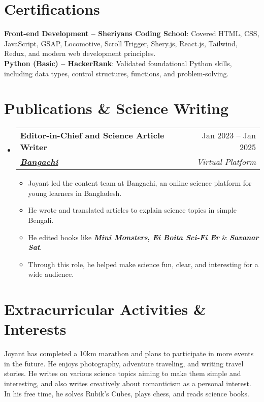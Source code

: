 \documentclass[a4paper, 11pt]{article}
\newcommand{\resumeItem}[1]{
  \item\small{
    {#1 \vspace{-2pt}}
  }
}
\newcommand{\resumeSubheading}[5]{
  \vspace{-2pt}\item
    \begin{tabularx}{\textwidth}[t]{X r}
      \textbf{#1} & #2 \\
      \textbf{\textit{\href{#3}{\small #4}}} & \textit{\small #5} \\
    \end{tabularx}\vspace{-7pt}
}
\newcommand{\resumeSubHeadingListStart}{\begin{itemize}[leftmargin=0in, label={}]}
\newcommand{\resumeSubHeadingListEnd}{\end{itemize}}
\newcommand{\resumeItemListStart}{\begin{itemize}}
\newcommand{\resumeItemListEnd}{\end{itemize}\vspace{-5pt}}
\begin{document}
\section{\textbf{Certifications}}
  \begin{itemize}[leftmargin=0in, label={}]
    \small{\item{
      \textbf{Front-end Development – Sheriyans Coding School}{: Covered HTML, CSS, JavaScript, GSAP, Locomotive, Scroll Trigger, Shery.js, React.js, Tailwind, Redux, and modern web development principles.} \\
      \textbf{Python (Basic) – HackerRank}{: Validated foundational Python skills, including data types, control structures, functions, and problem-solving.}
    }}
  \end{itemize}

\section{\textbf{Publications \& Science Writing}}
    \resumeSubHeadingListStart
        \resumeSubheading
            {Editor-in-Chief and Science Article Writer}{Jan 2023 -- Jan 2025}
            {https://bangachi.com/}{Bangachi}{Virtual Platform}
        \resumeItemListStart
            \resumeItem{Joyant led the content team at Bangachi, an online science platform for young learners in Bangladesh.}
            \resumeItem{He wrote and translated articles to explain science topics in simple Bengali.}
            \resumeItem{He edited books like \textbf{\textit{Mini Monsters}, \textit{Ei Boita Sci-Fi Er}} \& \textbf{\textit{Savanar Sat}}.}
            \resumeItem{Through this role, he helped make science fun, clear, and interesting for a wide audience.}
        \resumeItemListEnd
    \resumeSubHeadingListEnd

\section{\textbf{Extracurricular Activities \& Interests}}
    \small
    Joyant has completed a 10km marathon and plans to participate in more events in the future. He enjoys photography, adventure traveling, and writing travel stories. He writes on various science topics aiming to make them simple and interesting, and also writes creatively about romanticism as a personal interest. In his free time, he solves Rubik’s Cubes, plays chess, and reads science books.
\end{document}
